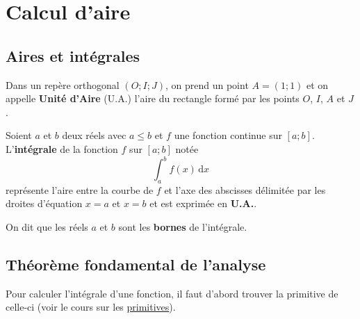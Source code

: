 


	
	
	
	
	\section{Calcul d'aire}
	
	\subsection{Aires et intégrales}
	
	Dans un repère orthogonal $(O; I; J)$, on prend un point $A = (1; 1)$ et on appelle \textbf{Unité d'Aire} (U.A.) l'aire du rectangle formé par les points $O$, $I$, $A$ et $J$.
	
	
	Soient $a$ et $b$ deux réels avec $a \leq b$ et $f$ une fonction continue sur $[a;b]$. L'\textbf{intégrale} de la fonction $f$ sur $[a;b]$ notée
	\[ \int_{a}^{b} f(x) \, \mathrm{d}x \]
	représente l'aire entre la courbe de $f$ et l'axe des abscisses délimitée par les droites d'équation $x = a$ et $x = b$
	et est exprimée en \textbf{U.A.}.
	
	
	On dit que les réels $a$ et $b$ sont les \textbf{bornes} de l'intégrale.
	
	\subsection{Théorème fondamental de l'analyse}
	
	Pour calculer l'intégrale d'une fonction, il faut d'abord trouver la primitive de celle-ci (voir le cours sur les \href{https://bacomathiqu.es/cours/terminale/primitives-equations-differentielles/}{primitives}).
	
